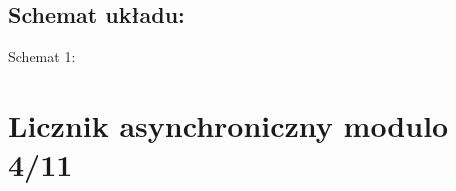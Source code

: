 \documentclass[12pt,a4paper]{article}
\begin{document}
		\subsection{Schemat układu:}
		
			\vspace{1.5cm}
			\begin{center}
				Schemat 1: 
			\end{center}
	
	\section{Licznik asynchroniczny modulo 4/11}
		
\end{document}
